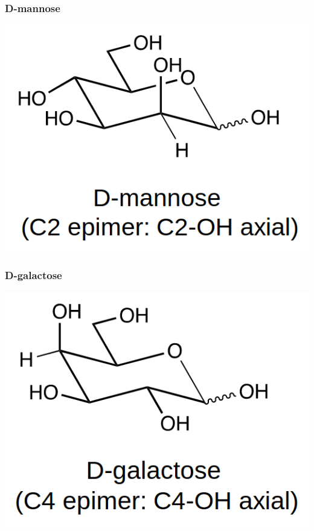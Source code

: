 \documentclass[11pt]{article}
\begin{document}
\subsubsection{D-mannose}
\label{sec:orge9d2cae}

\begin{center}
\includegraphics[scale=1.0]{./images/d-mannose.png}
\end{center}

\subsubsection{D-galactose}
\label{sec:org2f776f6}

\begin{center}
\includegraphics[scale=1.0]{./images/d-galactose.png}
\end{center}
\end{document}
